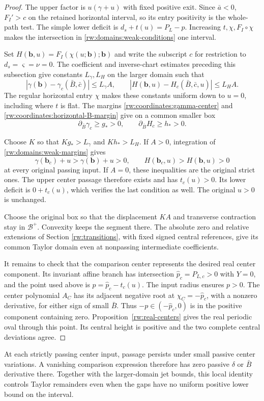 \begin{proof}
The upper factor is $u(\gamma+u)$ with fixed positive exit. Since
$\bar a<0$, $F_I'>c$ on the retained horizontal interval, so its
entry positivity is the whole-path test. The simple lower deficit is
$d_s+t(u)=P_L-p$. Increasing $t,\chi,F_I\circ\chi$ makes the
intersection in \eqref{rw:domains:weak-conditions} one interval.

Set $H(\mathbf b,u)=F_I(\chi(u;\mathbf b);\mathbf b)$ and write
the subscript $c$ for restriction to $d_s=\varsigma=\nu=0$.
The coefficient and inverse-chart estimates preceding this subsection
give constants $L_\gamma,L_H$ on the larger domain such that
\[
 |\gamma(\mathbf b)-\gamma_c(\bar B,\bar c)|\le L_\gamma A,
 \qquad
 |H(\mathbf b,u)-H_c(\bar B,\bar c,u)|\le L_H A.
\]
The regular horizontal entry $\chi$ makes these constants uniform
down to $u=0$, including where $t$ is flat.
The margins \eqref{rw:coordinates:gamma-center} and
\eqref{rw:coordinates:horizontal-B-margin} give on a common smaller box
\begin{equation}\label{rw:domains:weak-margins}
 \partial_{\bar B}\gamma_c\ge g_*>0,\qquad
 \partial_{\bar B}H_c\ge h_*>0.
\end{equation}

Choose $K$ so that $Kg_*>L_\gamma$ and $Kh_*>L_H$.
If $A>0$, integration of \eqref{rw:domains:weak-margins} gives
\[
 \gamma(\mathbf b_c)+u>\gamma(\mathbf b)+u>0,
 \qquad H(\mathbf b_c,u)>H(\mathbf b,u)>0
\]
at every original passing input. If $A=0$, these inequalities are
the original strict ones. The upper center passage therefore exists
and has $t_c(u)>0$. Its lower deficit is $0+t_c(u)$, which verifies
the last condition as well. The original $u>0$ is unchanged.

Choose the original box so that the displacement $KA$ and transverse
contraction stay in $\mathcal B^+$. Convexity keeps the segment
there. The absolute zero and relative extensions of Section
\ref{rw:transitions}, with fixed signed central references, give its
common Taylor domain even at nonpassing intermediate coefficients.

It remains to check that the comparison center represents the desired
real center component. Its invariant affine branch has intersection
$\widehat p_c=P_{L,c}>0$ with $Y=0$, and the point used above is
$p=\widehat p_c-t_c(u)$. The input radius ensures $p>0$.
The center polynomial $A_C$ has its adjacent negative root
at $\chi_C=-\widehat p_c$, with a nonzero derivative, for either sign
of small $\bar B$. Thus $-p\in(-\widehat p_c,0)$ is in the
positive component containing zero. Proposition~\ref{rw:real-centers}
gives the real periodic oval through this point. Its central height
is positive and the two complete central deviations agree.
\end{proof}

At each strictly passing center input, passage persists under small
passive center variations. A vanishing comparison expression therefore
has zero passive $\delta$ or $\bar B$ derivative there. Together
with the larger-domain jet bounds, this local identity controls Taylor
remainders even when the gaps have no uniform positive lower bound
on the interval.
